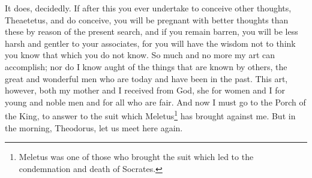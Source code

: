 \documentclass[letterpaper,12pt]{article}
\newcommand{\stephpag}[1]{\marginnote{\small\itshape\fontfamily{ppl}\selectfont #1}}
\begin{document}
\begin{drama}
\theaetetusspeaks
It does, decidedly.
\socratesspeaks
If after this you ever undertake to conceive other thoughts, Theaetetus, and do conceive, \stephpag{c} you will be pregnant with better thoughts than these by reason of the present search, and if you remain barren, you will be less harsh and gentler to your associates, for you will have the wisdom not to think you know that which you do not know. So much and no more my art can accomplish; nor do I know aught of the things that are known by others, the great and wonderful men who are today and have been in the past. This art, however, both my mother and I received from God, she for women and I for young and noble men and for all who are fair. \stephpag{d} And now I must go to the Porch of the King, to answer to the suit which Meletus\footnote{Meletus was one of those who brought the suit which led to the condemnation and death of Socrates.} has brought against me. But in the morning, Theodorus, let us meet here again.

\end{drama}
\end{document}
